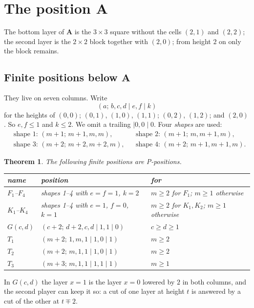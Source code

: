 \documentclass[11pt]{amsart}
\newtheorem{theorem}{Theorem}
\theoremstyle{definition}
\theoremstyle{remark}
\newcommand{\PA}{\mathbf{A}}
\begin{document}
\section{The position \texorpdfstring{$\PA$}{A}}\label{sec:A}

The bottom layer of $\PA$ is the $3\times3$ square without the cells $(2,1)$ and $(2,2)$; the
second layer is the $2\times2$ block together with $(2,0)$; from height $2$ on only the block
remains.

\subsection{Finite positions below \texorpdfstring{$\PA$}{A}}
They live on seven columns. Write
\[
(a;\,b,c,d\mid e,f\mid k)
\]
for the heights of $(0,0)$; $(0,1)$, $(1,0)$, $(1,1)$; $(0,2)$, $(1,2)$; and $(2,0)$. So
$e,f\le1$ and $k\le2$. We omit a trailing $\mid0,0\mid0$. Four \emph{shapes} are used:
\[
\begin{aligned}
&\text{shape 1: } (m+1;\,m+1,m,m), &&\text{shape 2: } (m+1;\,m,m+1,m),\\
&\text{shape 3: } (m+2;\,m+2,m+2,m), &&\text{shape 4: } (m+2;\,m+1,m+1,m).
\end{aligned}
\]

\begin{theorem}\label{thm:families}
The following finite positions are P-positions.
\begin{center}
\begin{tabular}{lll}
\toprule
name & position & for\\
\midrule
$F_1$--$F_4$ & shapes 1--4 with $e=f=1$, $k=2$ & $m\ge2$ for $F_1$; $m\ge1$ otherwise\\
$K_1$--$K_4$ & shapes 1--4 with $e=1$, $f=0$, $k=1$ & $m\ge2$ for $K_1,K_2$; $m\ge1$ otherwise\\
$G(c,d)$ & $(c+2;\,d+2,c,d\mid1,1\mid0)$ & $c\ge d\ge1$\\
$T_1$ & $(m+2;\,1,m,1\mid1,0\mid1)$ & $m\ge2$\\
$T_2$ & $(m+2;\,m,1,1\mid1,0\mid1)$ & $m\ge2$\\
$T_3$ & $(m+3;\,m,1,1\mid1,1\mid1)$ & $m\ge1$\\
\bottomrule
\end{tabular}
\end{center}
\end{theorem}

In $G(c,d)$ the layer $x=1$ is the layer $x=0$ lowered by $2$ in both columns, and the second
player can keep it so: a cut of one layer at height $t$ is answered by a cut of the other at
$t\mp2$.
\end{document}
